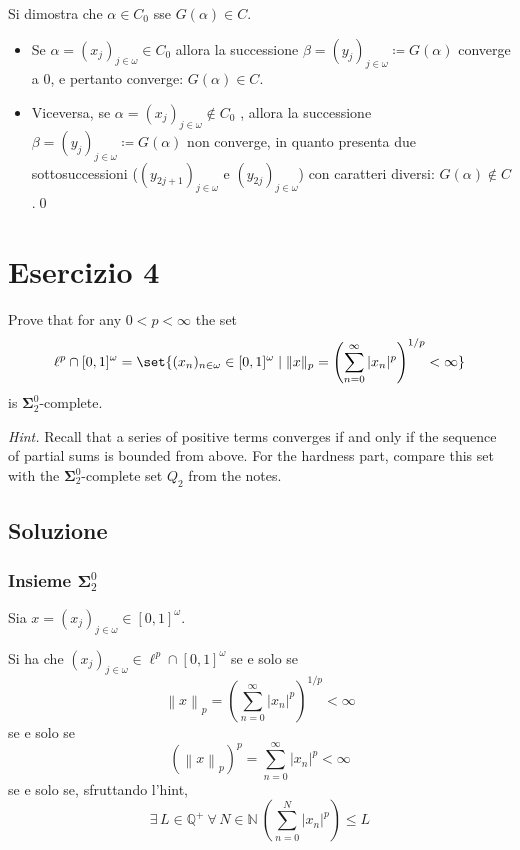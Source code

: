 \documentclass{article}
\newcommand{\1}{\mathds{1}}
\newcommand{\Q}{\mathds{Q}}
\newcommand{\N}{\mathds{N}}
\newcommand{\norma}[1]{%
\left\lVert#1\right\rVert%
}
\begin{document}
\begin{enumerate}
Si dimostra che \(\alpha \in C_{0}\) sse \(G(\alpha) \in C\).

\begin{itemize}
\item Se \(\alpha = (x_{j})_{j \in \omega} \in C_{0}\) allora la successione \(\beta= (y_{j})_{j \in \omega} \coloneqq G(\alpha)\) converge a \(0\), e pertanto converge: \(G(\alpha) \in C\).
\item Viceversa, se \(\alpha = (x_{j})_{j \in \omega}\notin C_{0}\) , allora la successione \(\beta= (y_{j})_{j \in \omega} \coloneqq G(\alpha)\) non converge, in quanto presenta due sottosuccessioni (\((y_{2j+1})_{j \in \omega}\) e \((y_{2j})_{j \in \omega}\)) con caratteri diversi: \(G(\alpha)\notin C\).\qed
\end{itemize}
\end{enumerate}
\section{Esercizio 4}
\label{sec:org4a4a996}

Prove that for any \(0 < p < \infty\) the set
\[
\ell^p \cap [0,1]^\omega =
\set{(x_n)_{n \in \omega} \in [0,1]^\omega
\mid
\|x\|_p = \left( \sum_{n=0}^\infty |x_n|^p \right)^{1/p} < \infty}
\]
is \(\bm{\Sigma}^0_2\)-complete.

\emph{Hint.} Recall that a series of positive terms converges if and only if the sequence of partial sums is bounded from above. For the hardness part, compare this set with the \(\bm{\Sigma}^0_2\)-complete set \(Q_2\) from the notes.
\subsection{Soluzione}
\label{sec:orga542720}

\subsubsection{Insieme \(\mathbf{\Sigma}^{0}_{2}\)}
\label{sec:orgb728007}

Sia \(x=(x_{j})_{j \in \omega} \in [0,1]^{\omega}\).

Si ha che \((x_{j})_{j \in \omega} \in \ell^{p}\cap[0,1]^{\omega}\) se e solo se
\begin{equation*}
\norma{x}_{p} = \left(\sum_{n=0}^{\infty}|x_{n}|^{p}\right)^{1/p}<\infty
\end{equation*}
se e solo se
\begin{equation*}
(\norma{x}_{p})^{p} = \sum_{n=0}^{\infty}|x_{n}|^{p} < \infty
\end{equation*}
se e solo se, sfruttando l'hint,
\begin{equation*}
\exists\, L \in \Q^{+}\ \forall\, N \in \N \ \left(\sum_{n=0}^{N} |x_{n}|^{p}\right) \le L
\end{equation*}
\end{document}
